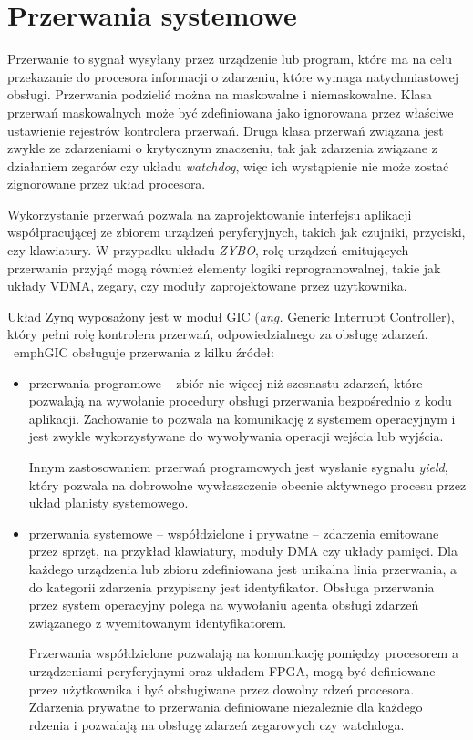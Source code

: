 
\section{Przerwania systemowe}
\label{sec:axi-interrupts}

Przerwanie to sygnał wysyłany przez urządzenie lub program, które ma na celu przekazanie do procesora informacji o zdarzeniu, które wymaga natychmiastowej obsługi.
Przerwania podzielić można na maskowalne i niemaskowalne. 
Klasa przerwań maskowalnych może być zdefiniowana jako ignorowana przez właściwe ustawienie rejestrów kontrolera przerwań. 
Druga klasa przerwań związana jest zwykle ze zdarzeniami o krytycznym znaczeniu, tak jak zdarzenia związane z działaniem zegarów czy układu \emph{watchdog}, więc ich wystąpienie nie może zostać zignorowane przez układ procesora. %

Wykorzystanie przerwań pozwala na zaprojektowanie interfejsu aplikacji współpracującej ze zbiorem urządzeń peryferyjnych, takich jak czujniki, przyciski, czy klawiatury. 
W przypadku układu \emph{ZYBO}, rolę urządzeń emitujących przerwania przyjąć mogą również elementy logiki reprogramowalnej, takie jak układy VDMA, zegary, czy moduły zaprojektowane przez użytkownika. %

Układ Zynq wyposażony jest w moduł GIC (\emph{ang.} Generic Interrupt Controller), który pełni rolę kontrolera przerwań, odpowiedzialnego za obsługę zdarzeń. \
emph{GIC} obsługuje przerwania z kilku źródeł:
\begin{itemize}
	\item przerwania programowe -- zbiór nie więcej niż szesnastu zdarzeń, które pozwalają na wywołanie procedury obsługi przerwania bezpośrednio z kodu aplikacji. Zachowanie to pozwala na komunikację z systemem operacyjnym i jest zwykle wykorzystywane do wywoływania operacji wejścia lub wyjścia. 
	
	Innym zastosowaniem przerwań programowych jest wysłanie sygnału \emph{yield}, który pozwala na dobrowolne wywłaszczenie obecnie aktywnego procesu przez układ planisty systemowego. %
	
	\item przerwania systemowe -- współdzielone i prywatne -- zdarzenia emitowane przez sprzęt, na przykład klawiatury, moduły DMA czy układy pamięci. %
	Dla każdego urządzenia lub zbioru zdefiniowana jest unikalna linia przerwania, a do kategorii zdarzenia przypisany jest identyfikator. 
	Obsługa przerwania przez system operacyjny polega na wywołaniu agenta obsługi zdarzeń związanego z wyemitowanym identyfikatorem. %
	
	Przerwania współdzielone pozwalają na komunikację pomiędzy procesorem a urządzeniami peryferyjnymi oraz układem FPGA, mogą być definiowane przez użytkownika i być obsługiwane przez dowolny rdzeń procesora. 
	Zdarzenia prywatne to przerwania definiowane niezależnie dla każdego rdzenia i pozwalają na obsługę zdarzeń zegarowych czy watchdoga.
\end{itemize}

